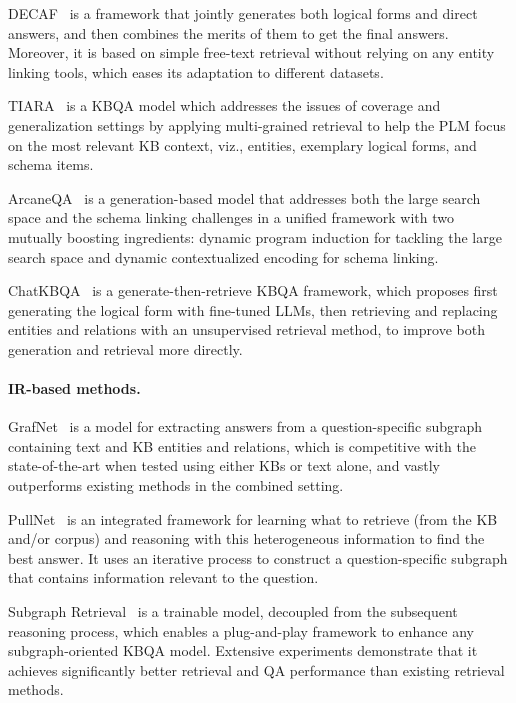 DECAF~\cite{DECAF} is a framework that jointly generates both logical forms and direct answers, and then combines the merits of them to get the final answers. Moreover, it is based on simple free-text retrieval without relying on any entity linking tools, which eases its adaptation to different datasets.

TIARA~\cite{shu-etal-2022-tiara} is a KBQA model which addresses the issues of coverage and generalization settings by applying multi-grained retrieval to help the PLM focus on the most relevant KB context, viz., entities, exemplary logical forms, and schema items.

ArcaneQA~\cite{gu-su-2022-arcaneqa} is a generation-based model that addresses both the large search space and the schema linking challenges in a unified framework with two mutually boosting ingredients: dynamic program induction for tackling the large search space and dynamic contextualized encoding for schema linking.

ChatKBQA~\cite{luo-etal-2024-chatkbqa} is a generate-then-retrieve KBQA framework, which proposes first generating the logical form with fine-tuned LLMs, then retrieving and replacing entities and relations with an unsupervised retrieval method, to improve both generation and retrieval more directly.

\paragraph {IR-based methods.}

GrafNet~\cite{sun-etal-2018-open} is a model for extracting answers from a question-specific subgraph containing text and KB entities and relations, which is competitive with the state-of-the-art when tested using either KBs or text alone, and vastly outperforms existing methods in the combined setting.

PullNet~\cite{sun2019pullnet} is an integrated framework for learning what to retrieve (from the KB and/or corpus) and  reasoning with this heterogeneous information to find the best answer. It uses an iterative process to construct a question-specific subgraph that contains information relevant to the question.

Subgraph Retrieval~\cite{zhang-etal-2022-subgraph} is a trainable model, decoupled from the subsequent reasoning process, which enables a plug-and-play framework to enhance any subgraph-oriented KBQA model. Extensive experiments demonstrate that it achieves significantly better retrieval and QA performance than existing retrieval methods.

